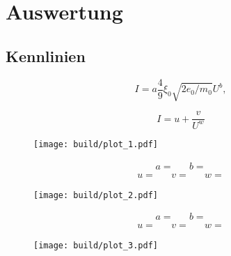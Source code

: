 \section{Auswertung}
\label{sec:auswertung}

\subsection{Kennlinien}

\begin{table}
	\caption{}
	\centering
	
	\label{tab:table_1}
\end{table}

\begin{equation*}
    I = a \frac{4}{9} \xi_0 \sqrt{2 e_0/m_0} U^b ,
\end{equation*}

\begin{equation*}
	I = u + \frac{v}{U^w}
\end{equation*}

\begin{figure}[H]
	\texttt{[image: build/plot\_1.pdf]}
	\caption{}
	\label{fig:plot_1}
\end{figure}

\begin{align*}
	a =  && b = 
\end{align*}
\begin{align*}
	u =  && v =  && w = 
\end{align*}

\begin{figure}[H]
	\texttt{[image: build/plot\_2.pdf]}
	\caption{}
	\label{fig:plot_2}
\end{figure}

\begin{align*}
	a =  && b = 
\end{align*}
\begin{align*}
	u =  && v =  && w = 
\end{align*}

\begin{figure}[H]
	\texttt{[image: build/plot\_3.pdf]}
	\caption{}
	\label{fig:plot_3}
\end{figure}

